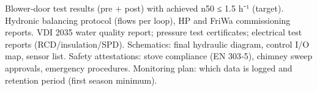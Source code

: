 \markdownRendererUlItem Blower‑door test results (pre + post) with achieved n50 ≤ 1.5 h⁻¹ (target).\markdownRendererUlItemEnd 
\markdownRendererUlItem Hydronic balancing protocol (flows per loop), HP and FriWa commissioning reports.\markdownRendererUlItemEnd 
\markdownRendererUlItem VDI 2035 water quality report; pressure test certificates; electrical test reports (RCD/insulation/SPD).\markdownRendererUlItemEnd 
\markdownRendererUlItem Schematics: final hydraulic diagram, control I/O map, sensor list.\markdownRendererUlItemEnd 
\markdownRendererUlItem Safety attestations: stove compliance (EN 303‑5), chimney sweep approvals, emergency procedures.\markdownRendererUlItemEnd 
\markdownRendererUlItem Monitoring plan: which data is logged and retention period (first season minimum).\markdownRendererUlItemEnd 
\markdownRendererUlEndTight 
\markdownRendererSectionEnd 
\markdownRendererSectionEnd \markdownRendererDocumentEnd